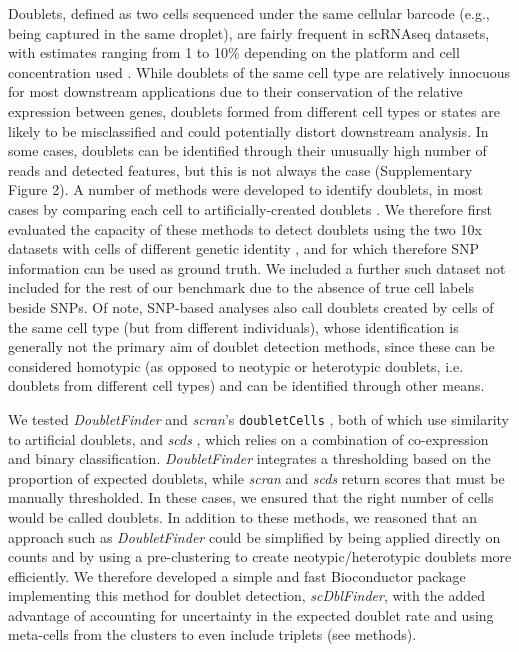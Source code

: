 \documentclass{bmcart}
\begin{document}
Doublets, defined as two cells sequenced under the same cellular barcode (e.g., being captured in the same droplet), are fairly frequent in scRNAseq datasets, with estimates ranging from 1 to 10\% depending on the platform and cell concentration used \citep{bloomEstimating2018,kangMultiplexedDemuxlet2018}. While doublets of the same cell type are relatively innocuous for most downstream applications due to their conservation of the relative expression between genes, doublets formed from different cell types or states are likely to be misclassified and could potentially distort downstream analysis. In some cases, doublets can be identified through their unusually high number of reads and detected features, but this is not always the case (Supplementary Figure 2). A number of methods were developed to identify doublets, in most cases by comparing each cell to artificially-created doublets \citep{mcginnisDoubletfinder2019, LunScran2016, BaisScds2019}. We therefore first evaluated the capacity of these methods to detect doublets using the two 10x datasets with cells of different genetic identity \citep{tianMixology2018}, and for which therefore SNP information can be used as ground truth. We included a further such dataset\citep{kangMultiplexedDemuxlet2018} not included for the rest of our benchmark due to the absence of true cell labels beside SNPs. Of note, SNP-based analyses also call doublets created by cells of the same cell type (but from different individuals), whose identification is generally not the primary aim of doublet detection methods, since these can be considered homotypic (as opposed to neotypic or heterotypic doublets, i.e. doublets from different cell types) and can be identified through other means.

We tested \textit{DoubletFinder} \citep{mcginnisDoubletfinder2019} and \textit{scran}'s \texttt{doubletCells} \citep{LunScran2016}, both of which use similarity to artificial doublets, and \textit{scds} \citep{BaisScds2019}, which relies on a combination of co-expression and binary classification. \textit{DoubletFinder} integrates a thresholding based on the proportion of expected doublets, while \textit{scran} and \textit{scds} return scores that must be manually thresholded. In these cases, we ensured that the right number of cells would be called doublets. In addition to these methods, we reasoned that an approach such as \textit{DoubletFinder} could be simplified by being applied directly on counts and by using a pre-clustering to create neotypic/heterotypic doublets more efficiently. We therefore developed a simple and fast Bioconductor package implementing this method for doublet detection, \textit{scDblFinder}, with the added advantage of accounting for uncertainty in the expected doublet rate and using meta-cells from the clusters to even include triplets (see methods).
\end{document}
